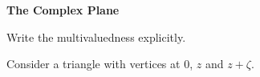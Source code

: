 {%
\begin{large}
  \noindent
  \textbf{The Complex Plane}
\end{large}


\begin{Hint}
  \label{hint 1i13}
\end{Hint}



\begin{Hint}
  \label{hint Rez+2Imz1}
\end{Hint}





\begin{Hint}
  \label{hint argument identities}
  Write the multivaluedness explicitly.
\end{Hint}




\begin{Hint}
  \label{hint triangle inequalities}
  Consider a triangle with vertices at $0$, $z$ and $z + \zeta$.
\end{Hint}





\begin{Hint}
  \label{hint -1 -3/4 8 1/6}
\end{Hint}


\begin{Hint}
  \label{hint 16 1/8}
\end{Hint}




\begin{Hint}
  \label{hint 1 z-i2 2}
\end{Hint}


\begin{Hint}
  \label{hint z-1+i 1}
\end{Hint}




\begin{Hint}
  \label{hint e i theta - 1 = 2}
\end{Hint}





}
